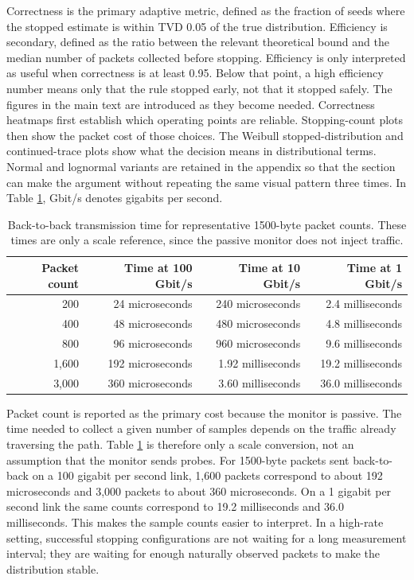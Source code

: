 \documentclass[a4paper,11pt]{report}
\begin{document}
Correctness is the primary adaptive metric, defined as the fraction of seeds where the stopped estimate is within TVD 0.05 of the true distribution. Efficiency is secondary, defined as the ratio between the relevant theoretical bound and the median number of packets collected before stopping. Efficiency is only interpreted as useful when correctness is at least 0.95. Below that point, a high efficiency number means only that the rule stopped early, not that it stopped safely. The figures in the main text are introduced as they become needed. Correctness heatmaps first establish which operating points are reliable. Stopping-count plots then show the packet cost of those choices. The Weibull stopped-distribution and continued-trace plots show what the decision means in distributional terms. Normal and lognormal variants are retained in the appendix so that the section can make the argument without repeating the same visual pattern three times. In Table \ref{tab:packet-timing-reference}, Gbit/s denotes gigabits per second.

\begin{table}[htbp]
\centering
\small
\begin{tabular}{rrrr}
\toprule
Packet count & Time at 100 Gbit/s & Time at 10 Gbit/s & Time at 1 Gbit/s \\
\midrule
200 & 24 microseconds & 240 microseconds & 2.4 milliseconds \\
400 & 48 microseconds & 480 microseconds & 4.8 milliseconds \\
800 & 96 microseconds & 960 microseconds & 9.6 milliseconds \\
1,600 & 192 microseconds & 1.92 milliseconds & 19.2 milliseconds \\
3,000 & 360 microseconds & 3.60 milliseconds & 36.0 milliseconds \\
\bottomrule
\end{tabular}
\caption{Back-to-back transmission time for representative 1500-byte packet counts. These times are only a scale reference, since the passive monitor does not inject traffic.}
\label{tab:packet-timing-reference}
\end{table}

Packet count is reported as the primary cost because the monitor is passive. The time needed to collect a given number of samples depends on the traffic already traversing the path. Table \ref{tab:packet-timing-reference} is therefore only a scale conversion, not an assumption that the monitor sends probes. For 1500-byte packets sent back-to-back on a 100 gigabit per second link, 1,600 packets correspond to about 192 microseconds and 3,000 packets to about 360 microseconds. On a 1 gigabit per second link the same counts correspond to 19.2 milliseconds and 36.0 milliseconds. This makes the sample counts easier to interpret. In a high-rate setting, successful stopping configurations are not waiting for a long measurement interval; they are waiting for enough naturally observed packets to make the distribution stable.
\end{document}
